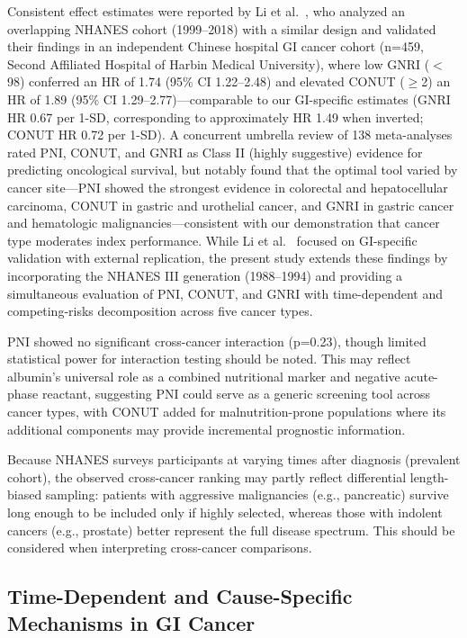\documentclass[review]{elsarticle}
\begin{document}
Consistent effect estimates were reported by Li et al.~\cite{li2025}, who analyzed an overlapping NHANES cohort (1999--2018) with a similar design and validated their findings in an independent Chinese hospital GI cancer cohort (n=459, Second Affiliated Hospital of Harbin Medical University), where low GNRI ($<$98) conferred an HR of 1.74 (95\% CI 1.22--2.48) and elevated CONUT ($\ge$2) an HR of 1.89 (95\% CI 1.29--2.77)---comparable to our GI-specific estimates (GNRI HR 0.67 per 1-SD, corresponding to approximately HR 1.49 when inverted; CONUT HR 0.72 per 1-SD). A concurrent umbrella review of 138 meta-analyses~\cite{li2025b} rated PNI, CONUT, and GNRI as Class II (highly suggestive) evidence for predicting oncological survival, but notably found that the optimal tool varied by cancer site---PNI showed the strongest evidence in colorectal and hepatocellular carcinoma, CONUT in gastric and urothelial cancer, and GNRI in gastric cancer and hematologic malignancies---consistent with our demonstration that cancer type moderates index performance. While Li et al.~\cite{li2025} focused on GI-specific validation with external replication, the present study extends these findings by incorporating the NHANES III generation (1988--1994) and providing a simultaneous evaluation of PNI, CONUT, and GNRI with time-dependent and competing-risks decomposition across five cancer types.

PNI showed no significant cross-cancer interaction (p=0.23), though limited statistical power for interaction testing should be noted. This may reflect albumin's universal role as a combined nutritional marker and negative acute-phase reactant, suggesting PNI could serve as a generic screening tool across cancer types, with CONUT added for malnutrition-prone populations where its additional components may provide incremental prognostic information.

Because NHANES surveys participants at varying times after diagnosis (prevalent cohort), the observed cross-cancer ranking may partly reflect differential length-biased sampling: patients with aggressive malignancies (e.g., pancreatic) survive long enough to be included only if highly selected, whereas those with indolent cancers (e.g., prostate) better represent the full disease spectrum. This should be considered when interpreting cross-cancer comparisons.

\subsection{Time-Dependent and Cause-Specific Mechanisms in GI Cancer}
\end{document}
